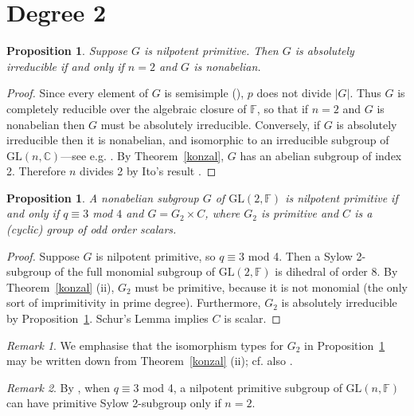 \documentclass[12pt]{amsart}
\newtheorem{proposition}[theorem]{Proposition}
\theoremstyle{definition}
\theoremstyle{remark}
\newtheorem*{remark}{Remark}
\begin{document}
\section{Degree 2}
\label{deg2}

\begin{proposition}
\label{absirredcase1}
 Suppose $G$ is nilpotent primitive. 
 Then $G$ is absolutely irreducible if and only 
 if $n=2$ and $G$ is nonabelian. 
\end{proposition}
\begin{proof} 
 Since every element of $G$ is semisimple  
 (\cite[Corollary 1, p.239]{Suprunenko}),
 $p$ does not divide $|G|$. 
 Thus $G$ is completely reducible over the algebraic 
 closure of $\mathbb{F}$, so 
 that if $n=2$ and $G$ is nonabelian then $G$ must be 
 absolutely  irreducible.
 Conversely, if $G$ is absolutely irreducible then it 
 is nonabelian, and isomorphic to an irreducible subgroup 
 of $\mathrm{GL}(n,\mathbb{C})$---see e.g. 
 \cite[Corollary 3.8, p.62]{Dixon}.
 By Theorem~\ref{konzal}, 
 $G$ has an abelian subgroup of index 2.  
 Therefore $n$ divides 2 by Ito's result 
 \cite[6.15, p.84]{Isaacs}.
\end{proof}

\begin{proposition}
\label{secchar}
 A nonabelian subgroup $G$ of
 $\mathrm{GL}(2,\mathbb{F})$ is nilpotent primitive 
 if and only if $q \equiv 3$ mod $4$ 
 and $G = G_2 \times C$, where $G_2$ is primitive
 and $C$ is a {\rm (}cyclic{\rm )} group of odd order 
 scalars.
\end{proposition}
\begin{proof}
 Suppose $G$ is nilpotent primitive, so $q \equiv 3$ mod 4.
 Then a Sylow 2-subgroup of the full monomial subgroup 
 of $\mathrm{GL}(2,\mathbb{F})$ is dihedral of order 8. 
 By Theorem~\ref{konzal} (ii), $G_2$ must be primitive, 
 because it is not monomial (the only sort of imprimitivity 
 in prime degree). Furthermore, $G_2$ is absolutely 
 irreducible by Proposition~\ref{absirredcase1}. Schur's 
 Lemma implies $C$ is scalar. 
\end{proof}
\begin{remark}
 We emphasise that the isomorphism types for $G_2$ 
 in Proposition~\ref{secchar} may be written down 
 from Theorem~\ref{konzal} (ii); cf. also \cite[II.2]{LGP}.
\end{remark}
\begin{remark}
 By \cite[III.4 (ii)]{LGP}, when $q\equiv 3$ mod 4,
 a nilpotent primitive subgroup of $\mathrm{GL}(n,\mathbb{F})$
 can have primitive Sylow 2-subgroup only if $n=2$.
\end{remark}
\end{document}
